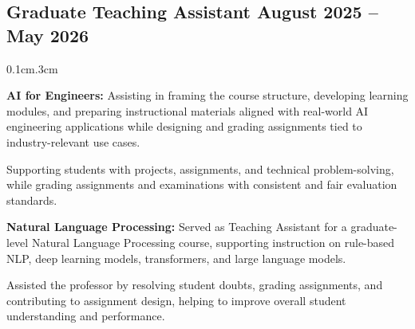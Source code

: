 \subsection{{Graduate Teaching Assistant \hfill August 2025 -- May 2026}}
\vspace{.70em}
\begin{adjustwidth}{0.1cm}{.3cm}

\begin{zitemize}

\item \textbf{AI for Engineers:} Assisting in framing the course structure, developing learning modules, and preparing instructional materials aligned with real-world AI engineering applications while designing and grading assignments tied to industry-relevant use cases.
\item Supporting students with projects, assignments, and technical problem-solving, while grading assignments and examinations with consistent and fair evaluation standards.

\item \textbf{Natural Language Processing:} Served as Teaching Assistant for a graduate-level Natural Language Processing course, supporting instruction on rule-based NLP, deep learning models, transformers, and large language models.
\item Assisted the professor by resolving student doubts, grading assignments, and contributing to assignment design, helping to improve overall student understanding and performance.

\end{zitemize}

\end{adjustwidth}

\vspace{0.35em}

